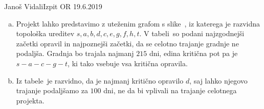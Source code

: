 \begin{naloga}{Janoš Vidali}{Izpit OR 19.6.2019}
\begin{odgovor}
\begin{enumerate}[(a)]
\item Projekt lahko predstavimo z uteženim grafom s slike~\fig,
iz katerega je raz\-vid\-na topološka ureditev $s, a, b, d, c, e, g, f, h, t$.
V tabeli~
so podani naj\-zgod\-nej\-ši začetki opravil in najpoznejši začetki,
da se celotno trajanje gradnje ne podaljša.
Gradnja bo trajala najmanj $215$ dni,
edina kritična pot pa je $s - a - c - g - t$,
ki tako vsebuje vsa kritična opravila.

\item Iz tabele~ je razvidno,
da je najmanj kritično opravilo $d$,
saj lahko njegovo trajanje podaljšamo za $100$ dni,
ne da bi vplivali na trajanje celotnega projekta.


\end{enumerate}
\end{odgovor}
\end{naloga}
